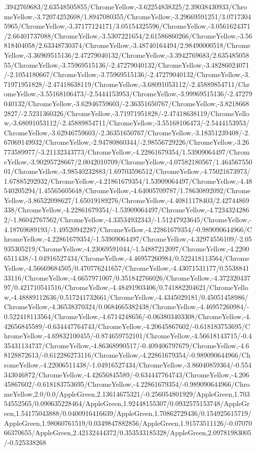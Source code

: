 {\begin{tikzternal}
.3942769683/2.63548505855/ChromeYellow,-3.62254838325/2.39038430933/ChromeYellow,-3.72074252608/1.8947080355/ChromeYellow,-3.29669591251/3.07173045965/ChromeYellow,-3.37177124171/3.05154325596/ChromeYellow,-3.0561624371/2.66401737088/ChromeYellow,-3.5307221654/2.61586860266/ChromeYellow,-3.56818404058/2.63348730374/ChromeYellow,-3.48740164494/2.98490000518/ChromeYellow,-3.36969515136/2.47279040132/ChromeYellow,-3.3942769683/2.63548505855/ChromeYellow,-3.75969515136/-2.47279040132/ChromeYellow,-3.48286024071/-2.1054180667/ChromeYellow,-3.75969515136/-2.47279040132/ChromeYellow,-3.71971951828/-2.47418638119/ChromeYellow,-3.68091053112/-2.45889854711/ChromeYellow,-3.55168106473/-2.5444153953/ChromeYellow,-3.99969515136/-2.47279040132/ChromeYellow,-3.62946759603/-2.36351650767/ChromeYellow,-3.82186682827/-2.5231360326/ChromeYellow,-3.71971951828/-2.47418638119/ChromeYellow,-3.68091053112/-2.45889854711/ChromeYellow,-3.55168106473/-2.5444153953/ChromeYellow,-3.62946759603/-2.36351650767/ChromeYellow,-3.18351239408/-2.67069149932/ChromeYellow,-2.94780860344/-2.98556729226/ChromeYellow,-3.26773589977/-3.21132343773/ChromeYellow,-4.22861679354/1.53909064497/ChromeYellow,-3.90295728667/2.0042010709/ChromeYellow,-4.07582180567/1.46456755001/ChromeYellow,-3.98540232883/1.69703596512/ChromeYellow,-4.75021673973/1.67885292932/ChromeYellow,-4.21861679354/1.53909064497/ChromeYellow,-4.48540205294/1.45565605648/ChromeYellow,-4.64005709787/1.78630892092/ChromeYellow,-3.86522098627/1.65019189276/ChromeYellow,-4.40811178403/2.42744869338/ChromeYellow,-4.22861679354/-1.53909064497/ChromeYellow,-4.72343242862/-1.86042767562/ChromeYellow,-4.33534932343/-1.51247923645/ChromeYellow,-4.18769689193/-1.49520942287/ChromeYellow,-4.22861679354/-0.989090644966/ChromeYellow,-4.22861679354/-1.53909064497/ChromeYellow,-4.32974556109/-2.05935305219/ChromeYellow,-4.23069591044/-1.54887212097/ChromeYellow,-4.22006511438/-1.04916527434/ChromeYellow,-4.46957260984/0.522418113564/ChromeYellow,-4.56669684505/0.470776241657/ChromeYellow,-4.43071531177/0.553884133116/ChromeYellow,-4.6657971007/0.351842766026/ChromeYellow,-4.37232043797/0.421710541516/ChromeYellow,-4.48491903406/0.741882204621/ChromeYellow,-4.48889112636/0.517241732661/ChromeYellow,-4.4345029181/0.45051458986/ChromeYellow,-4.36538370324/0.0684665382438/ChromeYellow,-4.46957260984/-0.522418113564/ChromeYellow,-4.6714248656/-0.063803403308/ChromeYellow,-4.42656845589/-0.634447764743/ChromeYellow,-4.20645867602/-0.618183753695/ChromeYellow,-4.69832100455/-0.874659752101/ChromeYellow,-4.56618143715/-0.435431134737/ChromeYellow,-4.86368990517/-0.409406797679/ChromeYellow,-4.68128872613/-0.612286273116/ChromeYellow,-4.22861679354/-0.989090644966/ChromeYellow,-4.22006511438/-1.04916527434/ChromeYellow,-3.86040859364/-0.554343046872/ChromeYellow,-4.42656845589/-0.634447764743/ChromeYellow,-4.20645867602/-0.618183753695/ChromeYellow,-4.22861679354/-0.989090644966/ChromeYellow,2.0/0.0/AppleGreen,2.13614675321/-0.256054801929/AppleGreen,1.70354552565/0.090635228464/AppleGreen,1.92448155307/0.0932575153748/AppleGreen,1.54175043888/0.0400916416639/AppleGreen,1.70862729436/0.154925615719/AppleGreen,1.98060761519/0.0349847882856/AppleGreen,1.91573511126/-0.0707066370655/AppleGreen,2.42132444372/0.353533185328/AppleGreen,2.09781983005/-0.525338268
\end{tikzternal}}
